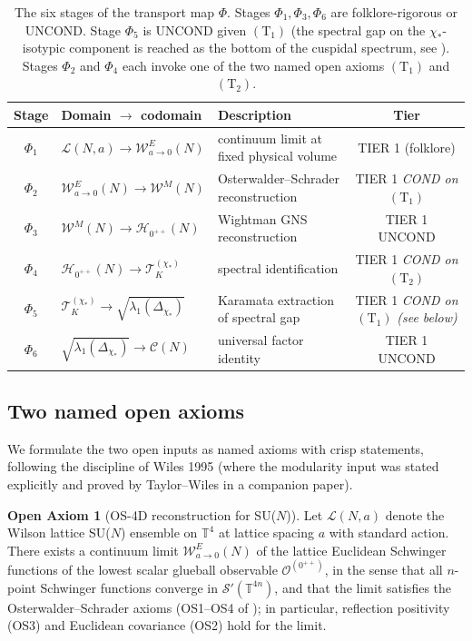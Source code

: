 \documentclass[11pt,a4paper,reqno]{amsart}
\theoremstyle{definition}
\newtheorem{axiom}{Open Axiom}
\newcommand{\TT}{\mathbb{T}}
\newcommand{\Phii}[1]{\Phi_{#1}}
\newcommand{\Cone}{(\mathrm{T}_{1})}
\newcommand{\Ctwo}{(\mathrm{T}_{2})}
\begin{document}
\begin{table}[ht]
\centering
\begin{tabular}{cllc}
\toprule
Stage & Domain $\to$ codomain & Description & Tier \\
\midrule
$\Phii{1}$ & $\mathcal{L}(N,a)\to\mathcal{W}^E_{a\to 0}(N)$ &
  continuum limit at fixed physical volume & TIER 1 (folklore) \\
$\Phii{2}$ & $\mathcal{W}^E_{a\to 0}(N)\to\mathcal{W}^M(N)$ &
  Osterwalder--Schrader reconstruction & TIER 1
  \emph{COND on $\Cone$} \\
$\Phii{3}$ & $\mathcal{W}^M(N)\to\mathcal{H}_{0^{++}}(N)$ &
  Wightman GNS reconstruction & TIER 1 UNCOND \\
$\Phii{4}$ & $\mathcal{H}_{0^{++}}(N)\to\mathcal{T}^{(\chi_*)}_K$ &
  spectral identification & TIER 1
  \emph{COND on $\Ctwo$} \\
$\Phii{5}$ & $\mathcal{T}^{(\chi_*)}_K\to\sqrt{\lambda_1(\Delta_{\chi_*})}$ &
  Karamata extraction of spectral gap & TIER 1
  \emph{COND on $\Cone$} \emph{(see below)} \\
$\Phii{6}$ & $\sqrt{\lambda_1(\Delta_{\chi_*})}\to\mathcal{C}(N)$ &
  universal factor identity & TIER 1 UNCOND \\
\bottomrule
\end{tabular}
\caption{The six stages of the transport map $\Phi$. Stages
$\Phii{1},\Phii{3},\Phii{6}$ are folklore-rigorous or UNCOND.
Stage $\Phii{5}$ is UNCOND given $\Cone$ (the spectral gap on the
$\chi_*$-isotypic component is reached as the bottom of the cuspidal
spectrum, see \cite{Remondiere2026Selberg}). Stages $\Phii{2}$ and
$\Phii{4}$ each invoke one of the two named open axioms $\Cone$ and
$\Ctwo$.}\label{tab:stages}
\end{table}

\subsection{Two named open axioms}\label{ss:axioms}

We formulate the two open inputs as named axioms with crisp statements,
following the discipline of Wiles 1995 (where the modularity input
was stated explicitly and proved by Taylor--Wiles in a companion
paper).

\begin{axiom}[OS-4D reconstruction for SU($N$)]\label{ax:T1}
  Let $\mathcal{L}(N,a)$ denote the Wilson lattice SU($N$) ensemble
  on $\TT^4$ at lattice spacing $a$ with standard action. There exists
  a continuum limit $\mathcal{W}^E_{a\to 0}(N)$ of the lattice
  Euclidean Schwinger functions of the lowest scalar glueball
  observable $\mathcal{O}^{(0^{++})}$, in the sense that all
  $n$-point Schwinger functions converge in
  $\mathcal{S}'(\TT^{4n})$, and that the limit satisfies the
  Osterwalder--Schrader axioms (OS1--OS4 of
  \cite{OsterwalderSchrader1973,OsterwalderSchrader1975}); in
  particular, reflection positivity (OS3) and Euclidean covariance
  (OS2) hold for the limit.
\end{axiom}
\end{document}
